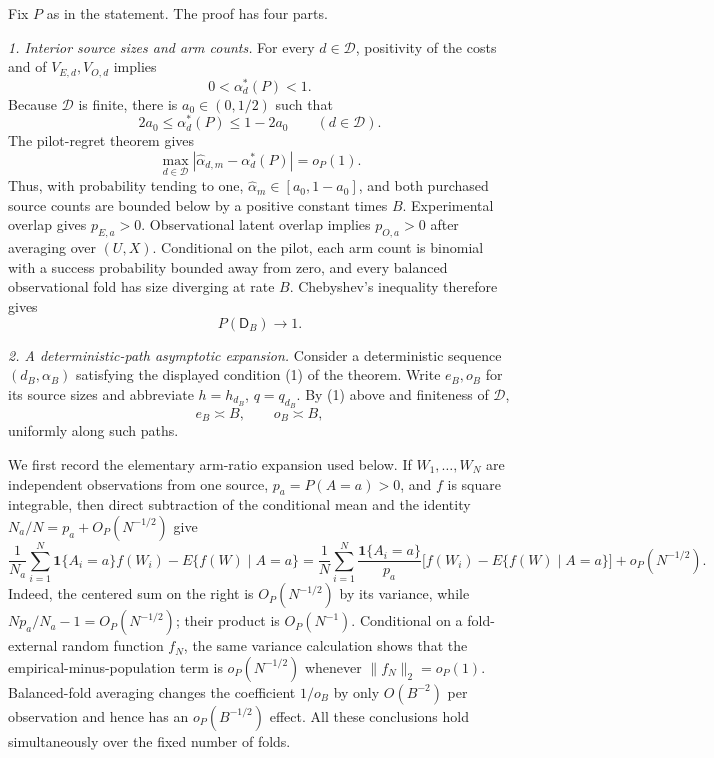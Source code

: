 Fix \(P\) as in the statement.  The proof has four parts.

\emph{1. Interior source sizes and arm counts.}
For every \(d\in\mathcal D\), positivity of the costs and of \(V_{E,d},V_{O,d}\) implies
\[
 0<\alpha_d^*(P)<1.
\]
Because \(\mathcal D\) is finite, there is \(a_0\in(0,1/2)\) such that
\[
 2a_0\le \alpha_d^*(P)\le1-2a_0
 \qquad(d\in\mathcal D).
 \tag{1}
\]
The pilot-regret theorem gives
\[
 \max_{d\in\mathcal D}
 |\widehat\alpha_{d,m}-\alpha_d^*(P)|=o_P(1).
 \tag{2}
\]
Thus, with probability tending to one, \(\widehat\alpha_m\in[a_0,1-a_0]\), and both purchased source counts are bounded below by a positive constant times \(B\).  Experimental overlap gives \(p_{E,a}>0\).  Observational latent overlap implies \(p_{O,a}>0\) after averaging over \((U,X)\).  Conditional on the pilot, each arm count is binomial with a success probability bounded away from zero, and every balanced observational fold has size diverging at rate \(B\).  Chebyshev's inequality therefore gives
\[
 P(\mathsf D_B)\longrightarrow1.
 \tag{3}
\]

\emph{2. A deterministic-path asymptotic expansion.}
Consider a deterministic sequence \((d_B,\alpha_B)\) satisfying the displayed condition (1) of the theorem.  Write \(e_B,o_B\) for its source sizes and abbreviate \(h=h_{d_B}\), \(q=q_{d_B}\).  By (1) above and finiteness of \(\mathcal D\),
\[
 e_B\asymp B,\qquad o_B\asymp B,
 \tag{4}
\]
uniformly along such paths.

We first record the elementary arm-ratio expansion used below.  If \(W_1,\ldots,W_N\) are independent observations from one source, \(p_a=P(A=a)>0\), and \(f\) is square integrable, then direct subtraction of the conditional mean and the identity \(N_a/N=p_a+O_P(N^{-1/2})\) give
\[
 \frac{1}{N_a}\sum_{i=1}^N\mathbf 1\{A_i=a\}f(W_i)
 -E\{f(W)\mid A=a\}
 =\frac1N\sum_{i=1}^N\frac{\mathbf 1\{A_i=a\}}{p_a}
 \bigl[f(W_i)-E\{f(W)\mid A=a\}\bigr]
 +o_P(N^{-1/2}).
 \tag{5}
\]
Indeed, the centered sum on the right is \(O_P(N^{-1/2})\) by its variance, while \(Np_a/N_a-1=O_P(N^{-1/2})\); their product is \(O_P(N^{-1})\).  Conditional on a fold-external random function \(f_N\), the same variance calculation shows that the empirical-minus-population term is \(o_P(N^{-1/2})\) whenever \(\|f_N\|_2=o_P(1)\).  Balanced-fold averaging changes the coefficient \(1/o_B\) by only \(O(B^{-2})\) per observation and hence has an \(o_P(B^{-1/2})\) effect.  All these conclusions hold simultaneously over the fixed number of folds.

